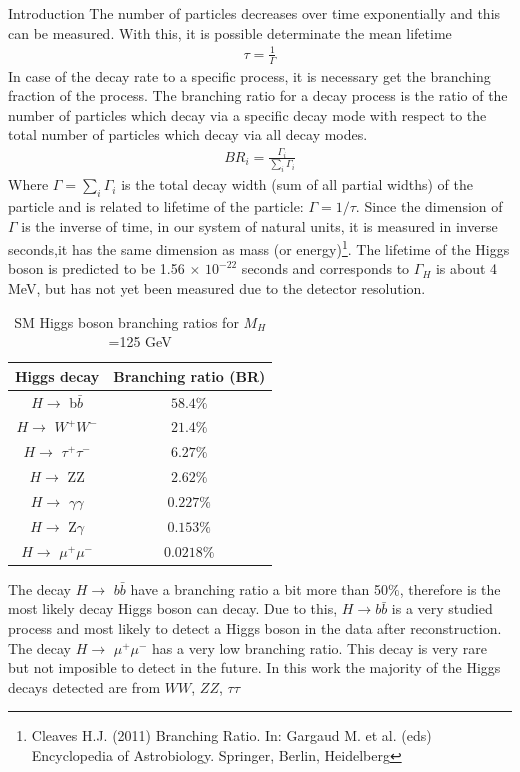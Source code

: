\begin{chapter}{Introduction}
The number of particles decreases over time exponentially and this can be measured. With this, it is possible determinate the mean lifetime\cite{griff}
\begin{align}
\tau=\frac{1}{\Gamma}
\end{align}
In case of the decay rate to a specific process, it is necessary get the branching fraction of the process. 
The branching ratio for a decay process is the ratio of the number of particles which decay via a specific decay mode with respect to the total number of particles which decay via all decay modes.
\begin{align}
BR_i =\frac{\Gamma_i}{\sum_{i}\Gamma_i}
\end{align}
Where $\Gamma=\sum_i\Gamma_i$ is the total decay width (sum of all partial widths) of the particle and is related to lifetime of the particle: $\Gamma=1/\tau$.
Since the dimension of $\Gamma$ is the inverse of time, in our system of natural units, it is measured in inverse seconds,it has the same dimension as mass (or energy)\footnote{Cleaves H.J. (2011) Branching Ratio. In: Gargaud M. et al. (eds) Encyclopedia of Astrobiology. Springer, Berlin, Heidelberg}. The lifetime of the Higgs boson is predicted to be 1.56 $\times$ $10^{-22}$ seconds and corresponds to $\Gamma_H$ is about 4 MeV, but has not yet been measured due to the detector resolution\cite{cms-manual}.
\\
\begin{table}[!htbp] 
\caption[SM Higgs boson branching ratios for $M_H$ =125 GeV]{SM Higgs boson branching ratios for $M_H$ =125 GeV \protect \cite{pd}}
\centering
\begin{tabular}{|c|c|}
\hline
Higgs decay & Branching ratio (BR)\\
\hline
$H \rightarrow$ b$\bar{b}$ &$58.4\%$ \\
\hline
 $H \rightarrow$ $W^+W^-$ &$21.4\%$ \\
\hline
$H \rightarrow$ $\tau^+ \tau^-$ & $6.27\%$\\
\hline
$H \rightarrow$ ZZ &$2.62\%$\\
\hline
$H \rightarrow$ $\gamma\gamma$ &$0.227\%$\\
\hline
$H \rightarrow$ Z$\gamma$ &$0.153\%$\\
\hline
$H \rightarrow$ $\mu^+\mu^-$ &$0.0218\%$\\
\hline
\end{tabular}
\label{higgs1}
\end{table}
The decay $H \rightarrow$ $b\bar{b}$ have a branching ratio a bit more than 50$\%$, therefore is the most likely decay Higgs boson can decay. Due to this, $H\rightarrow b\bar{b}$ is a very studied process and most likely to detect a Higgs boson in the data after reconstruction. The decay $H \rightarrow$ $\mu^+\mu^-$ has a very low branching ratio. This decay is very rare but not imposible to detect in the future. In this work the majority of the Higgs decays detected are from $WW$, $ZZ$, $\tau \tau$\\


\end{chapter}
